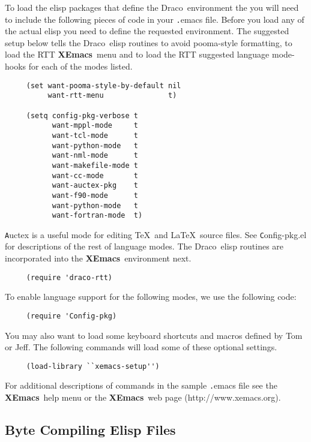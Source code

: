 \documentclass[11pt]{nmemo}
\newcommand{\comp}[1]{{\normalfont\texttt#1}}
\newcommand{\draco}{{\normalfont\sffamily Draco}}
\newcommand{\xemacs}{{\normalfont\bfseries XEmacs}}
\begin{document}
To load the elisp packages that define the \draco\ environment the
you will need to include
the following pieces of code in your \comp{.emacs} file.  Before you
load any of the actual elisp you need to define the requested
environment.  The suggested setup below tells the \draco\ elisp
routines to avoid pooma-style formatting, to load the RTT \xemacs\ menu
and to load the RTT suggested language mode-hooks for each of the modes
listed. 
 
\begin{verbatim}
     (set want-pooma-style-by-default nil
          want-rtt-menu               t)

     (setq config-pkg-verbose t
           want-mppl-mode     t
           want-tcl-mode      t
           want-python-mode   t
           want-nml-mode      t
           want-makefile-mode t
           want-cc-mode       t
           want-auctex-pkg    t
           want-f90-mode      t
           want-python-mode   t
           want-fortran-mode  t)
\end{verbatim}

\comp{Auctex} is a useful mode for editing \TeX\ and \LaTeX\ source
files.  See \comp{Config-pkg.el} for descriptions of the rest of
language modes.  The \draco\ elisp routines are incorporated into the
\xemacs\ environment next.

\begin{verbatim}
     (require 'draco-rtt)
\end{verbatim}

To enable language support for the following modes, we use the
following code:

\begin{verbatim}
     (require 'Config-pkg)
\end{verbatim}

You may also want to load some keyboard shortcuts and macros defined
by Tom or Jeff.  The following commands will load some of
these optional settings.

\begin{verbatim}
     (load-library ``xemacs-setup'')
\end{verbatim}

For additional descriptions of commands in the sample \comp{.emacs}
file see the \xemacs\ help menu or the \xemacs\ web page
(http://www.xemacs.org). 

\subsection{Byte Compiling Elisp Files}
\label{sec:byte-compile}
\end{document}
